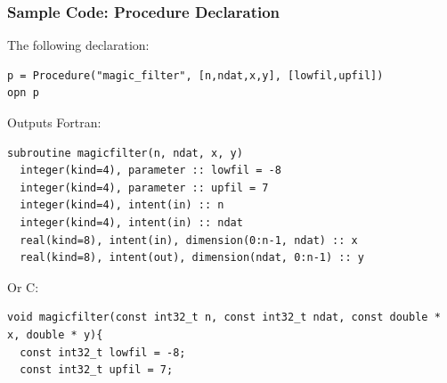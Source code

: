\documentclass{beamer}
\begin{document}
\begin{frame}[fragile]
\frametitle{Sample Code: Procedure Declaration}
The following declaration:
\tiny
{}
\begin{lstlisting}
p = Procedure("magic_filter", [n,ndat,x,y], [lowfil,upfil])
opn p
\end{lstlisting}
\normalsize 
Outputs Fortran:
\tiny
{}
\begin{lstlisting}
subroutine magicfilter(n, ndat, x, y)
  integer(kind=4), parameter :: lowfil = -8
  integer(kind=4), parameter :: upfil = 7
  integer(kind=4), intent(in) :: n
  integer(kind=4), intent(in) :: ndat
  real(kind=8), intent(in), dimension(0:n-1, ndat) :: x
  real(kind=8), intent(out), dimension(ndat, 0:n-1) :: y
\end{lstlisting}
\normalsize
Or C:
\tiny
{}
\begin{lstlisting}
void magicfilter(const int32_t n, const int32_t ndat, const double * x, double * y){
  const int32_t lowfil = -8;
  const int32_t upfil = 7;
\end{lstlisting}
\end{frame}
\end{document}
